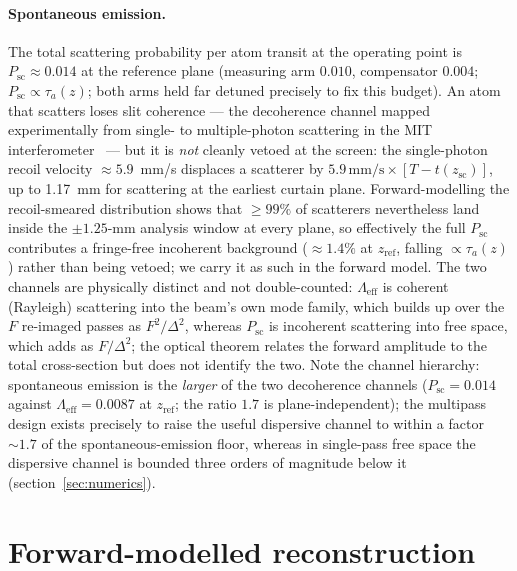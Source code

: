 \documentclass[11pt,a4paper]{article}
\begin{document}
\paragraph{Spontaneous emission.} The total scattering probability per atom transit at the operating point is $P_\text{sc} \approx 0.014$ at the reference plane (measuring arm $0.010$, compensator $0.004$; $P_\text{sc} \propto \tau_a(z)$; both arms held far detuned precisely to fix this budget). An atom that scatters loses slit coherence --- the decoherence channel mapped experimentally from single- to multiple-photon scattering in the MIT interferometer~\cite{Chapman1995, Kokorowski2001} --- but it is \emph{not} cleanly vetoed at the screen: the single-photon recoil velocity $\approx 5.9$~mm/s displaces a scatterer by $5.9\,\text{mm/s}\times[T - t(z_\text{sc})]$, up to 1.17~mm for scattering at the earliest curtain plane. Forward-modelling the recoil-smeared distribution shows that $\geq 99\%$ of scatterers nevertheless land inside the $\pm 1.25$-mm analysis window at every plane, so effectively the full $P_\text{sc}$ contributes a fringe-free incoherent background ($\approx 1.4\%$ at $z_\text{ref}$, falling $\propto \tau_a(z)$) rather than being vetoed; we carry it as such in the forward model. The two channels are physically distinct and not double-counted: $\Lambda_\text{eff}$ is coherent (Rayleigh) scattering into the beam's own mode family, which builds up over the $F$ re-imaged passes as $F^2/\Delta^2$, whereas $P_\text{sc}$ is incoherent scattering into free space, which adds as $F/\Delta^2$; the optical theorem relates the forward amplitude to the total cross-section but does not identify the two. Note the channel hierarchy: spontaneous emission is the \emph{larger} of the two decoherence channels ($P_\text{sc} = 0.014$ against $\Lambda_\text{eff} = 0.0087$ at $z_\text{ref}$; the ratio $1.7$ is plane-independent); the multipass design exists precisely to raise the useful dispersive channel to within a factor $\sim 1.7$ of the spontaneous-emission floor, whereas in single-pass free space the dispersive channel is bounded three orders of magnitude below it (section~\ref{sec:numerics}).

\section{Forward-modelled reconstruction}
\label{sec:reconstruction}
\end{document}
